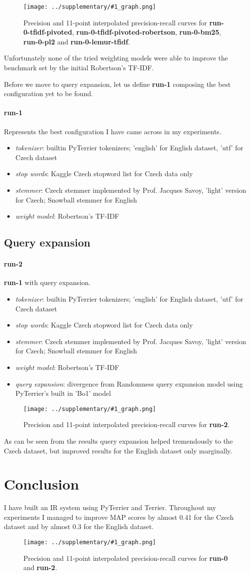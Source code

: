 \documentclass[10pt]{article}
\newcommand{\RunName}[1]{\textbf{#1}}
\newcommand{\Run}[6]{
\begin{samepage}
    \paragraph{\RunName{#1}} #6

    \begin{itemize}
        \item \emph{tokenizer}: #2
        \item \emph{stop words}: #3
        \item \emph{stemmer}: #4
        \item \emph{weight model}: #5
    \end{itemize}
\end{samepage}
}
\newcommand{\RunQE}[7]{
\begin{samepage}
    \paragraph{\RunName{#1}} #7

    \begin{itemize}
        \item \emph{tokenizer}: #2
        \item \emph{stop words}: #3
        \item \emph{stemmer}: #4
        \item \emph{weight model}: #5
        \item \emph{query expansion}: #6
    \end{itemize}
\end{samepage}
}
\newcommand{\RunResults}[2]{%
\begin{table}[h]
\centering

    \caption{Results of #2.\label{tbl:#1}}
\end{table}

\begin{figure}[h]
\centering
\texttt{[image: ../supplementary/\#1\_graph.png]}
    \caption{Precision and 11-point interpolated precision-recall curves for
    #2.\label{fig:#1}}
\end{figure}
}
\begin{document}
\RunResults{wmodels}{\RunName{run-0-tfidf-pivoted},
\RunName{run-0-tfidf-pivoted-robertson}, \RunName{run-0-bm25},
\RunName{run-0-pl2} and \RunName{run-0-lemur-tfidf}}

Unfortunately none of the tried weighting models were able to improve the
benchmark set by the initial Robertson's TF-IDF.

Before we move to query expansion, let us define \RunName{run-1} composing the
best configuration yet to be found.

\Run{run-1}{
    builtin PyTerrier tokenizers; 'english' for English dataset, 'utf' for Czech dataset
}{
    Kaggle Czech stopword list for Czech data only
}{
    Czech stemmer implemented by Prof. Jacques Savoy, 'light' version for Czech;
    Snowball stemmer for English
}{Robertson's TF-IDF}{Represents the best configuration I have came across in
my experiments.}


\subsection{Query expansion}

\RunQE{run-2}{
    builtin PyTerrier tokenizers; 'english' for English dataset, 'utf' for Czech dataset
}{
    Kaggle Czech stopword list for Czech data only
}{
    Czech stemmer implemented by Prof. Jacques Savoy, 'light' version for Czech;
    Snowball stemmer for English
}{Robertson's TF-IDF}{divergence from Randomness query expansion model using PyTerrier's built in 'Bo1' model}{\RunName{run-1} with query expansion.}

\RunResults{query_expansion}{\RunName{run-2}}

As can be seen from the results query expansion helped tremendously to the
Czech dataset, but improved results for the English dataset only marginally.

\section{Conclusion}

I have built an IR system using PyTerrier and Terrier. Throughout my experiments
I managed to improve MAP scores by almost 0.41 for the Czech dataset and by
almost 0.3 for the English dataset.

\RunResults{final}{\RunName{run-0} and \RunName{run-2}}


\end{document}

